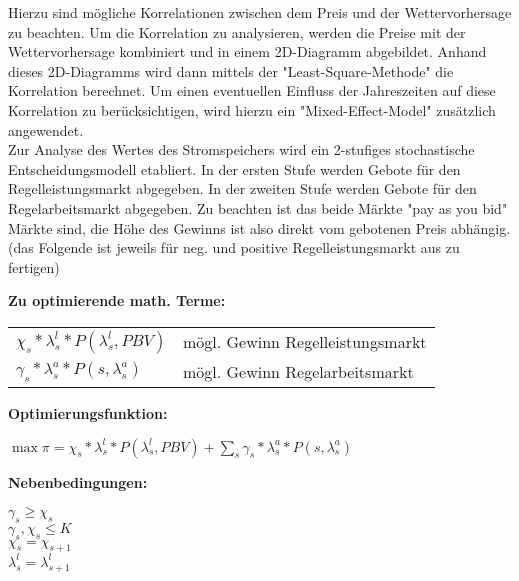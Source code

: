\documentclass[british,         %
BCOR=2mm,                       %
11pt,                           %
a4paper,						%
oneside,						%
cdgeometry,                     %
toc=chapterentrydotfill,        %
toc=indent,                     %
bibliography=totoc,         	%
listof=totoc,                   %
numbers=noenddot,				%
parskip=full,                   %
cdmath=false					%
]{article}                  %
\begin{document}
Hierzu sind mögliche Korrelationen zwischen dem Preis und der Wettervorhersage zu beachten.
Um die Korrelation zu analysieren, werden die Preise mit 
der Wettervorhersage kombiniert und in einem 2D-Diagramm abgebildet. Anhand dieses 2D-Diagramms wird
dann mittels der "Least-Square-Methode" die Korrelation berechnet. Um einen eventuellen Einfluss der Jahreszeiten 
auf diese Korrelation zu berücksichtigen, wird hierzu ein "Mixed-Effect-Model" zusätzlich angewendet.\\

Zur Analyse des Wertes des Stromspeichers wird ein 2-stufiges stochastische Entscheidungsmodell etabliert. 
In der ersten Stufe werden Gebote für den Regelleistungsmarkt abgegeben. In der zweiten Stufe werden Gebote für den Regelarbeitsmarkt
abgegeben. Zu beachten ist das beide Märkte "pay as you bid" Märkte sind, die Höhe des Gewinns ist also direkt vom 
gebotenen Preis abhängig.\\


(das Folgende ist jeweils für neg. und positive Regelleistungsmarkt aus zu fertigen)


\begin{flushleft}\textbf{Zu optimierende math. Terme:}\end{flushleft}
\begin{tabular}{l l}
	$\chi_s * \lambda_s^l * P(\lambda_s^l, PBV)$ & mögl. Gewinn Regelleistungsmarkt \\
	$\gamma_s * \lambda_s^a * P(s,\lambda_s^a)$  & mögl. Gewinn Regelarbeitsmarkt   \\
\end{tabular}



\begin{flushleft}\textbf{Optimierungsfunktion:}\\\end{flushleft}
\begin{addmargin}[25pt]{0pt}
	$\max \pi = \chi_s * \lambda_s^l * P(\lambda_s^l, PBV) + \sum_{s} \gamma_s * \lambda_s^a *P(s,\lambda_s^a)$\\
\end{addmargin}

\begin{flushleft}\textbf{Nebenbedingungen:}\end{flushleft}
\begin{addmargin}[25pt]{0pt}
	$ \gamma_s \geq \chi_s$ \\%
	$ \gamma_s, \chi_s \leq K$\\ %
	$\chi_s = \chi_{s+1}$\\
	$\lambda_s^l = \lambda_{s+1}^l $ \\
\end{addmargin}
\end{document}
